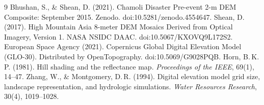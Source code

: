 ﻿\documentclass[11pt,a4paper]{article}
\begin{document}
\begin{thebibliography}{9}\small
{} Bhushan, S., \& Shean, D. (2021). Chamoli Disaster Pre-event 2-m DEM Composite: September 2015.
Zenodo. doi:10.5281/zenodo.4554647.
 Shean, D. (2017). High Mountain Asia 8-meter DEM Mosaics Derived from Optical Imagery, Version 1.
NASA NSIDC DAAC. doi:10.5067/KXOVQ9L172S2.
 European Space Agency (2021). Copernicus Global Digital Elevation Model (GLO-30). Distributed by
OpenTopography. doi:10.5069/G9028PQB.
 Horn, B.\,K.\,P. (1981). Hill shading and the reflectance map. \emph{Proceedings of the IEEE},
69(1), 14--47.
 Zhang, W., \& Montgomery, D.\,R. (1994). Digital elevation model grid size, landscape
representation, and hydrologic simulations. \emph{Water Resources Research}, 30(4), 1019--1028.
\end{thebibliography}
\end{document}

